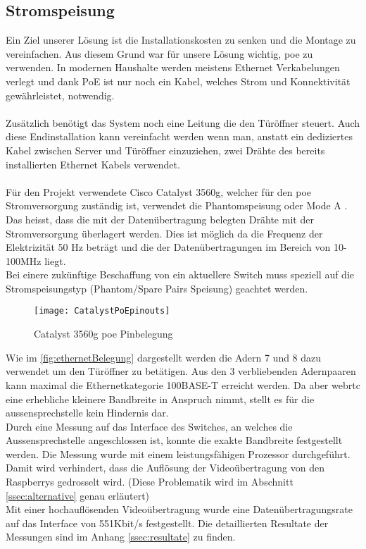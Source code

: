 \subsection{Stromspeisung}
\label{sec:poe}
Ein Ziel unserer Lösung ist die Installationskosten zu senken und die Montage zu vereinfachen. Aus diesem Grund war für unsere Lösung wichtig, \gls{poe} zu verwenden. In modernen Haushalte werden meistens Ethernet Verkabelungen verlegt und dank PoE ist nur noch ein Kabel, welches Strom und Konnektivität gewährleistet, notwendig.
\\
\\
Zusätzlich benötigt das System noch eine Leitung die den Türöffner steuert.
Auch diese Endinstallation kann vereinfacht werden wenn man, anstatt ein dediziertes Kabel zwischen Server und Türöffner einzuziehen,  zwei Drähte des bereits installierten Ethernet Kabels verwendet.
\\
\\
Für den Projekt verwendete Cisco Catalyst 3560g, welcher für den \gls{poe} Stromversorgung zuständig ist, verwendet die Phantomspeisung oder Mode A \cite{poe}. Das heisst, dass die mit der Datenübertragung belegten Drähte mit der Stromversorgung überlagert werden. Dies ist möglich da die Frequenz der Elektrizität 50 Hz beträgt und die der Datenübertragungen im Bereich von 10-100MHz liegt.
\\
Bei einere zukünftige Beschaffung von ein aktuellere Switch muss speziell auf die Stromspeisungstyp (Phantom/Spare Pairs Speisung) geachtet werden.

\begin{figure}[htb!]
	\begin{center}
		\texttt{[image: CatalystPoEpinouts]}
		\caption[Catalyst Pinouts]{Catalyst 3560g \gls{poe} Pinbelegung}
		\label{fig:catalystPinouts}
	\end{center}
\end{figure}

Wie im \cref{fig:ethernetBelegung} dargestellt werden die Adern 7 und 8 dazu verwendet um den Türöffner zu betätigen. Aus den 3 verbliebenden Adernpaaren kann maximal die Ethernetkategorie 100BASE-T erreicht werden. Da aber \gls{webrtc} eine erhebliche kleinere Bandbreite in Anspruch nimmt, stellt es für die \gls{aussensprechstelle} kein Hindernis dar.
\\
Durch eine Messung auf das Interface des Switches, an welches die Aussensprechstelle angeschlossen ist, konnte die exakte Bandbreite festgestellt werden. Die Messung wurde mit einem leistungsfähigen Prozessor durchgeführt. Damit wird verhindert, dass die Auflösung der Videoübertragung von den Raspberrys gedrosselt wird. (Diese Problematik wird im Abschnitt \ref{ssec:alternative} genau erläutert)
\\
Mit einer hochauflösenden Videoübertragung wurde eine Datenübertragungsrate auf das Interface von 551Kbit/s festgestellt. Die detaillierten Resultate der Messungen sind im Anhang \ref{ssec:resultate} zu finden.

